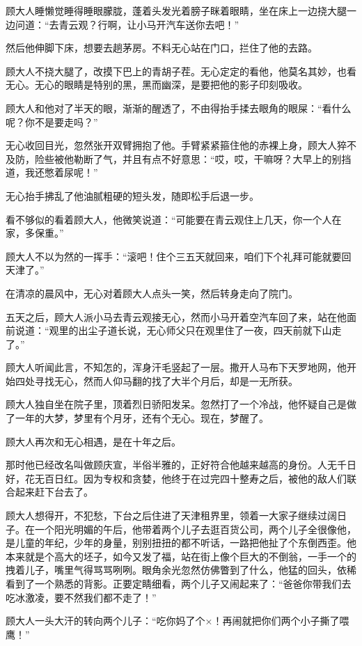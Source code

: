 顾大人睡懒觉睡得睡眼朦胧，蓬着头发光着膀子眯着眼睛，坐在床上一边挠大腿一边问道：``去青云观？行啊，让小马开汽车送你去吧！''

然后他伸脚下床，想要去趟茅房。不料无心站在门口，拦住了他的去路。

顾大人不挠大腿了，改摸下巴上的青胡子茬。无心定定的看他，他莫名其妙，也看无心。无心的眼睛是特别的黑，黑而幽深，是要把他的影子印刻吸收。

顾大人和他对了半天的眼，渐渐的醒透了，不由得抬手揉去眼角的眼屎：``看什么呢？你不是要走吗？''

无心收回目光，忽然张开双臂拥抱了他。手臂紧紧箍住他的赤裸上身，顾大人猝不及防，险些被他勒断了气，并且有点不好意思：``哎，哎，干嘛呀？大早上的别挡道，我还憋着尿呢！''

无心抬手拂乱了他油腻粗硬的短头发，随即松手后退一步。

看不够似的看着顾大人，他微笑说道：``可能要在青云观住上几天，你一个人在家，多保重。''

顾大人不以为然的一挥手：``滚吧！住个三五天就回来，咱们下个礼拜可能就要回天津了。''

在清凉的晨风中，无心对着顾大人点头一笑，然后转身走向了院门。

五天之后，顾大人派小马去青云观接无心，然而小马开着空汽车回了来，站在他面前说道：``观里的出尘子道长说，无心师父只在观里住了一夜，四天前就下山走了。''

顾大人听闻此言，不知怎的，浑身汗毛竖起了一层。撒开人马布下天罗地网，他开始四处寻找无心，然而人仰马翻的找了大半个月后，却是一无所获。

顾大人独自坐在院子里，顶着烈日骄阳发呆。忽然打了一个冷战，他怀疑自己是做了一年的大梦，梦里有个月牙，还有个无心。现在，梦醒了。

顾大人再次和无心相遇，是在十年之后。

那时他已经改名叫做顾庆宣，半俗半雅的，正好符合他越来越高的身份。人无千日好，花无百日红。因为专权和贪婪，他终于在过完四十整寿之后，被他的敌人们联合起来赶下台去了。

顾大人想得开，不犯愁，下台之后住进了天津租界里，领着一大家子继续过阔日子。在一个阳光明媚的午后，他带着两个儿子去逛百货公司，两个儿子全很像他，是儿童的年纪，少年的身量，别别扭扭的都不听话，一路把他扯了个东倒西歪。他本来就是个高大的坯子，如今又发了福，站在街上像个巨大的不倒翁，一手一个的拽着儿子，嘴里气得骂骂咧咧。眼角余光忽然仿佛瞥到了什么，他猛的回头，依稀看到了一个熟悉的背影。正要定睛细看，两个儿子又闹起来了：``爸爸你带我们去吃冰激凌，要不然我们都不走了！''

顾大人一头大汗的转向两个儿子：``吃你妈了个×！再闹就把你们两个小子撕了喂鹰！''

